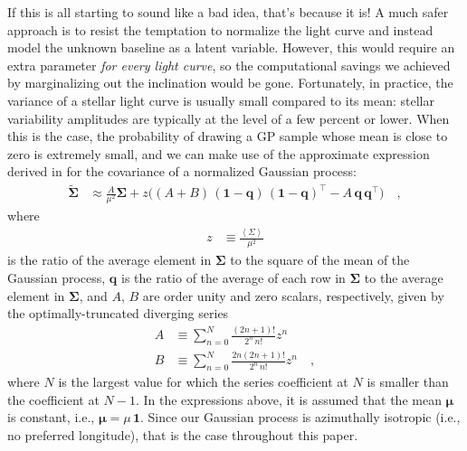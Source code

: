 \documentclass[modern]{aastex62}
\begin{document}
If this is all starting to sound like a bad idea, that's because it is!
A much safer approach is to resist the temptation to normalize the light curve
and instead model the unknown baseline as a latent variable. However,
this would require an extra parameter \emph{for every light curve}, so the
computational savings we achieved by marginalizing out the inclination
would be gone. Fortunately, in practice, the variance of a stellar light curve
is usually small compared to its mean: stellar variability amplitudes are
typically at the level of a few percent or lower. When this is the case,
the probability of drawing a GP sample whose mean is close to zero is
extremely small, and we can make use of the approximate expression derived
in \citet{Luger2020} for the covariance of a normalized Gaussian process:
%
\begin{align}
    \label{eq:SigmaTilde}
    \tilde{\pmb{\Sigma}}
     & \approx
    \frac{A}{\mu^2} \pmb{\Sigma} +
    z \Big(
    (A + B) \, (\mathbf{1} - \mathbf{q}) \, (\mathbf{1} - \mathbf{q})^\top
    - A \, \mathbf{q} \, \mathbf{q}^\top
    \Big)
    \quad,
\end{align}
%
where
%
\begin{align}
    z & \equiv \frac{\left< \Sigma \right>}{\mu^2}
\end{align}
%
is the ratio of the average element in $\pmb{\Sigma}$
to the square of the mean of the Gaussian process,
$\mathbf{q}$ is the ratio of the average of each row in $\pmb{\Sigma}$
to the average element in $\pmb{\Sigma}$, and $A$, $B$ are
order unity and zero scalars, respectively,
given by the optimally-truncated diverging series
%
\begin{align}
    \label{eq:baseline_alpha}
    A
     & \equiv
    \sum\limits_{n=0}^N
    \frac{(2n + 1)!}{2^n \, n!}
    z^n
    \\[1em]
    \label{eq:baseline_beta}
    B
     & \equiv
    \sum\limits_{n=0}^N
    \frac{2n(2n + 1)!}{2^n \, n!}
    z^n
    \quad,
\end{align}
%
where $N$ is the largest value for which the series coefficient at $N$ is
smaller than the coefficient at $N - 1$. In the expressions above, it is
assumed that the mean $\pmb{\mu}$ is constant, i.e., $\pmb{\mu} = \mu\, \mathbf{1}$.
Since our Gaussian process is azimuthally isotropic (i.e., no preferred
longitude), that is the case throughout this paper.
\end{document}
